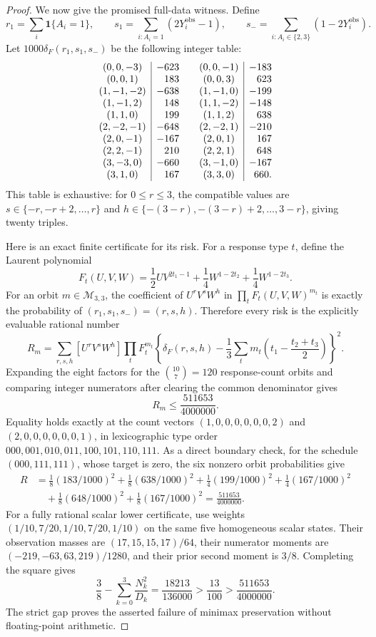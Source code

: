 \documentclass{article}
\begin{document}
\begin{proof}
We now give the promised full-data witness.  Define
\[
 r_1=\sum_i\mathbf1\{A_i=1\},\qquad
 s_1=\sum_{i:A_i=1}(2Y_i^{\mathrm{obs}}-1),\qquad
 s_-=\sum_{i:A_i\in\{2,3\}}(1-2Y_i^{\mathrm{obs}}).
\]
Let \(1000\delta_F(r_1,s_1,s_-)\) be the following integer table:
\[
\begin{array}{c|r@{\qquad}c|r}
(0,0,-3)&-623&(0,0,-1)&-183\\
(0,0,1)&183&(0,0,3)&623\\
(1,-1,-2)&-638&(1,-1,0)&-199\\
(1,-1,2)&148&(1,1,-2)&-148\\
(1,1,0)&199&(1,1,2)&638\\
(2,-2,-1)&-648&(2,-2,1)&-210\\
(2,0,-1)&-167&(2,0,1)&167\\
(2,2,-1)&210&(2,2,1)&648\\
(3,-3,0)&-660&(3,-1,0)&-167\\
(3,1,0)&167&(3,3,0)&660.
\end{array}
\]
This table is exhaustive: for \(0\leq r\leq3\), the compatible values are \(s\in\{-r,-r+2,\ldots,r\}\) and \(h\in\{-(3-r),-(3-r)+2,\ldots,3-r\}\), giving twenty triples.

Here is an exact finite certificate for its risk.  For a response type \(t\), define the Laurent polynomial
\[
 F_t(U,V,W)=\frac12UV^{2t_1-1}
 +\frac14W^{1-2t_2}+\frac14W^{1-2t_3}.
\]
For an orbit \(m\in\mathcal M_{3,3}\), the coefficient of \(U^rV^sW^h\) in \(\prod_tF_t(U,V,W)^{m_t}\) is exactly the probability of \((r_1,s_1,s_-)=(r,s,h)\).  Therefore every risk is the explicitly evaluable rational number
\[
 R_m=\sum_{r,s,h}[U^rV^sW^h]\prod_tF_t^{m_t}
 \left\{\delta_F(r,s,h)-\frac13\sum_tm_t
 \left(t_1-\frac{t_2+t_3}{2}\right)\right\}^2.
\]
Expanding the eight factors for the \(\binom{10}{7}=120\) response-count orbits and comparing integer numerators after clearing the common denominator gives
\[
 R_m\leq\frac{511653}{4000000}.
\]
Equality holds exactly at the count vectors \((1,0,0,0,0,0,0,2)\) and \((2,0,0,0,0,0,0,1)\), in lexicographic type order \(000,001,010,011,100,101,110,111\).  As a direct boundary check, for the schedule \((000,111,111)\), whose target is zero, the six nonzero orbit probabilities give
\[
 \begin{aligned}
 R&=\frac18(183/1000)^2+\frac18(638/1000)^2
 +\frac14(199/1000)^2+\frac14(167/1000)^2\\
 &\quad+\frac18(648/1000)^2+\frac18(167/1000)^2
 =\frac{511653}{4000000}.
 \end{aligned}
\]
For a fully rational scalar lower certificate, use weights \((1/10,7/20,1/10,7/20,1/10)\) on the same five homogeneous scalar states.  Their observation masses are \((17,15,15,17)/64\), their numerator moments are \((-219,-63,63,219)/1280\), and their prior second moment is \(3/8\).  Completing the square gives
\[
 \frac38-\sum_{k=0}^3\frac{N_k^2}{D_k}
 =\frac{18213}{136000}>\frac{13}{100}
 >\frac{511653}{4000000}.
\]
The strict gap proves the asserted failure of minimax preservation without floating-point arithmetic.


\end{proof}
\end{document}
